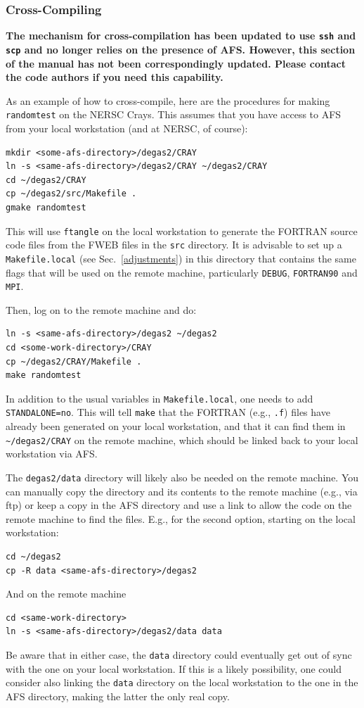 \documentclass[12pt]{report}
\begin{document}
\subsubsection{Cross-Compiling}
\label{cross}

{\bf The mechanism for cross-compilation has been updated to use
{\tt ssh} and {\tt scp} and no longer relies on the presence
of AFS.  However, this section of the
manual has not been correspondingly updated.
Please contact the code authors if you need this capability.}

As an example of how to cross-compile, here are the procedures for 
making {\tt randomtest} on the NERSC Crays. This assumes that you
have access to AFS from your local workstation (and at NERSC, of
course):

\begin{verbatim}
mkdir <some-afs-directory>/degas2/CRAY
ln -s <same-afs-directory>/degas2/CRAY ~/degas2/CRAY
cd ~/degas2/CRAY
cp ~/degas2/src/Makefile .
gmake randomtest
\end{verbatim}

This will use {\tt ftangle} on the local workstation to generate
the FORTRAN source code files from the FWEB files in the \verb+src+
directory. It is advisable to set up a {\tt Makefile.local} 
(see Sec.~\ref{adjustments}) in this
directory that contains the same flags that will be used on the
remote machine, particularly {\tt DEBUG}, {\tt FORTRAN90}
and {\tt MPI}.

Then, log on to the remote machine and do:
\begin{verbatim}
ln -s <same-afs-directory>/degas2 ~/degas2
cd <some-work-directory>/CRAY
cp ~/degas2/CRAY/Makefile .
make randomtest
\end{verbatim}

In addition to the usual variables in {\tt Makefile.local}, one
needs to add {\tt STANDALONE=no}. This will tell {\tt make} that 
the FORTRAN (e.g., {\tt .f}) files have already been generated on
your local workstation, and that it can find them in
\verb+~/degas2/CRAY+ on the remote machine, which should be
linked back to your local workstation via AFS.

The \verb+degas2/data+ directory will likely also be needed on the 
remote machine. You can manually copy the directory and its contents
to the remote machine (e.g., via ftp) 
or keep a copy in the AFS directory and use 
a link to allow the code on the remote machine to find the files.
E.g., for the second option, starting on the local workstation:
\begin{verbatim}
cd ~/degas2
cp -R data <same-afs-directory>/degas2
\end{verbatim}
And on the remote machine
\begin{verbatim}
cd <same-work-directory>
ln -s <same-afs-directory>/degas2/data data
\end{verbatim}
Be aware that in either case, the \verb+data+ directory could eventually
get out of sync with the one on your local workstation. If this
is a likely possibility, one could consider also linking the 
\verb+data+ directory on the local workstation to the one in the
AFS directory, making the latter the only real copy.
\end{document}
